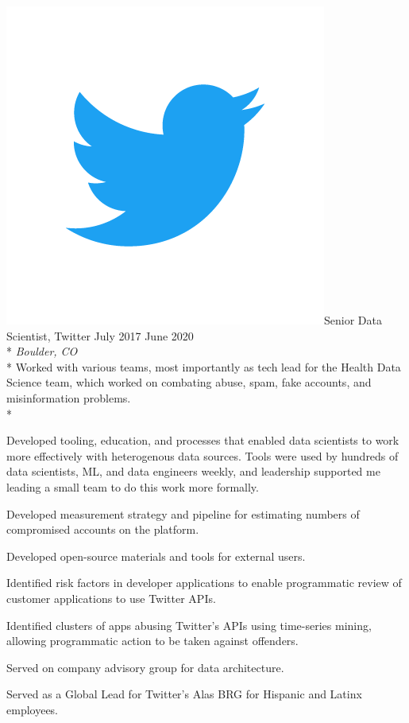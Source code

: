 \documentclass[print]{friggeri-cv} %
\newcommand{\twittericon}{\includegraphics[scale=0.05]{Twitter_Logo_Blue.png}}%
\begin{document}
\begin{description} \itemsep1pt \parskip0pt 
  \item \twittericon {\largeheaderfont Senior Data Scientist, Twitter} \hfill
    {\smallheaderfont July 2017 \textemdash June 2020}\\*
    {\footnotesize \emph{Boulder, CO}} \\*
    Worked with various teams, most importantly as tech lead for the Health Data Science team,
    which worked on combating abuse, spam, fake accounts, and misinformation problems.\\*
    \begin{myitemize}
      \item Developed tooling, education, and processes that enabled data scientists to work more effectively with 
      heterogenous data sources. Tools were used by hundreds of data scientists, ML, and data engineers weekly, and leadership supported 
      me leading a small team to do this work more formally.
      \item Developed measurement strategy and pipeline for estimating numbers of compromised accounts on the platform.
      \item Developed open-source materials and tools for external users.\autocite{search_tweets_python}\autocite{do_more_with_twtter_data}
      \item Identified risk factors in developer applications to enable programmatic review of customer applications to use Twitter APIs.
      \item Identified clusters of apps abusing Twitter's APIs using time-series mining, allowing
      programmatic action to be taken against offenders.
      \item Served on company advisory group for data architecture.
      \item Served as a Global Lead for Twitter's Alas BRG for Hispanic and Latinx employees.
    \end{myitemize}

\end{description}

\end{document}
